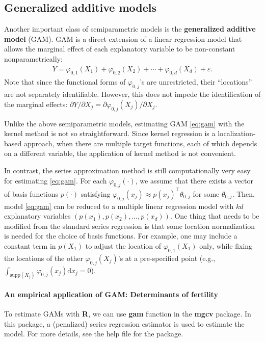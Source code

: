 \documentclass[10.5pt, A4paper, openany, uplatex]{book}
\newcommand{\eps}{\varepsilon}
\numberwithin{equation}{section}
\begin{document}
\subsection{Generalized additive models}

Another important class of semiparametric models is the \textbf{generalized additive model} (GAM).
GAM is a direct extension of a linear regression model that allows the marginal effect of each explanatory variable to be non-constant nonparametrically:
\begin{align}\label{eq:gam}
	Y = \varphi_{0,1}(X_1) + \varphi_{0,2}(X_2) + \cdots + \varphi_{0,d}(X_d) + \eps.
\end{align}
Note that since the functional forms of $\varphi_{0,j}$'s are unrestricted, their ``locations'' are not separately identifiable.
However, this does not impede the identification of the marginal effects: $\partial Y/ \partial X_j = \partial \varphi_{0,j}(X_j) / \partial X_j$. 

Unlike the above semiparametric models, estimating GAM \eqref{eq:gam} with the kernel method is not so straightforward.
Since kernel regression is a localization-based approach, when there are multiple target functions, each of which depends on a different variable, the application of kernel method is not convenient.

In contrast, the series approximation method is still computationally very easy for estimating \eqref{eq:gam}.
For each $\varphi_{0,j}(\cdot)$, we assume that there exists a vector of basis functions $p(\cdot)$ satisfying $\varphi_{0,j}(x_j) \approx p(x_j)^\top \theta_{0,j}$ for some $\theta_{0,j}$.
Then, model \eqref{eq:gam} can be reduced to a multiple linear regression model with $kd$ explanatory variables $(p(x_1), p(x_2), \ldots, p(x_d))$.
One thing that needs to be modified from the standard series regression is that some location normalization is needed for the choice of basis functions.
For example, one may include a constant term in $p(X_1)$ to adjust the location of $\varphi_{0,1}(X_1)$ only, while fixing the locations of the other $\varphi_{0,j}(X_j)$'s at a pre-specified point (e.g., $\int_{\text{supp}(X_j)}\varphi_{0,j}(x_j) \text{d}x_j = 0$).

\paragraph*{An empirical application of GAM: Determinants of fertility}

To estimate GAMs with \textbf{R}, we can use \textbf{gam} function in the \textbf{mgcv} package.
In this package, a (penalized) series regression estimator is used to estimate the model.
For more details, see the help file for the package.
\end{document}
